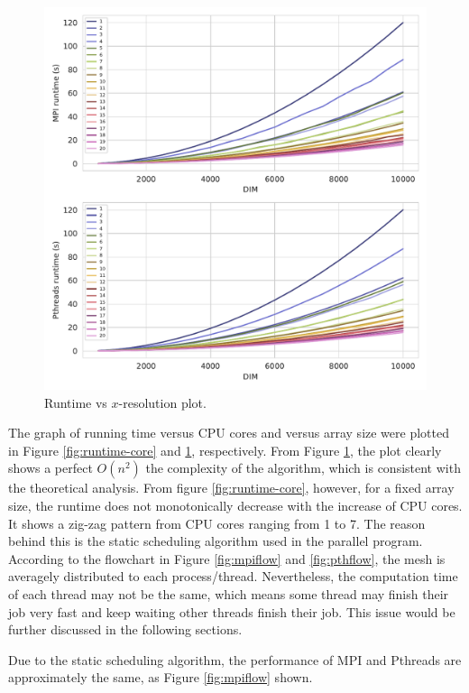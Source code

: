 \documentclass[twoside,12pt]{article}
\theoremstyle{definition}
\theoremstyle{remark}
\begin{document}
\begin{figure}[t!]
    \centering
    \includegraphics[width=\textwidth]{../analysis/runtime-dim.pdf}
    \caption{Runtime vs $x$-resolution plot.}
    \label{fig:runtime-dim}
\end{figure}

The graph of running time versus CPU cores and versus array size were plotted
in Figure \ref{fig:runtime-core} and \ref{fig:runtime-dim}, respectively.
From Figure \ref{fig:runtime-dim}, the plot clearly shows a perfect $O(n^2)$
the complexity of the algorithm, which is consistent with the theoretical analysis.
From figure \ref{fig:runtime-core}, however, for a fixed array size, 
the runtime does not monotonically decrease with the increase of CPU cores.
It shows a zig-zag pattern from CPU cores ranging from 1 to 7.
The reason behind this is the static scheduling algorithm used in the
parallel program.
According to the flowchart in Figure \ref{fig:mpiflow} and \ref{fig:pthflow},
the mesh is averagely distributed to each process/thread.
Nevertheless, the computation time of each thread may not be the same,
which means some thread may finish their job very fast and keep waiting
other threads finish their job. 
This issue would be further discussed in the following sections.

Due to the static scheduling algorithm, the performance of 
MPI and Pthreads are approximately the same, as Figure \ref{fig:mpiflow}
shown.
\end{document}
